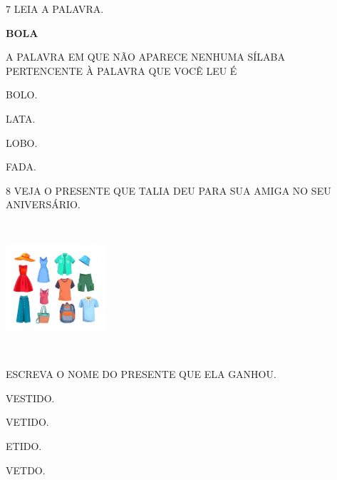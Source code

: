 \num{7} LEIA A PALAVRA.

\textbf{BOLA}

A PALAVRA EM QUE NÃO APARECE NENHUMA SÍLABA PERTENCENTE À PALAVRA QUE VOCÊ LEU É 

\begin{escolha}
\item BOLO.

\item LATA.

\item LOBO.

\item FADA.
\end{escolha}


\num{8} VEJA O PRESENTE QUE TALIA DEU PARA SUA AMIGA NO SEU ANIVERSÁRIO.

\includegraphics[width=1.45972in,height=1.93403in]{media/image232.jpg}


ESCREVA O NOME DO PRESENTE QUE ELA GANHOU.

\begin{escolha}
\item VESTIDO.

\item VETIDO.

\item ETIDO.

\item VETDO.
\end{escolha}


